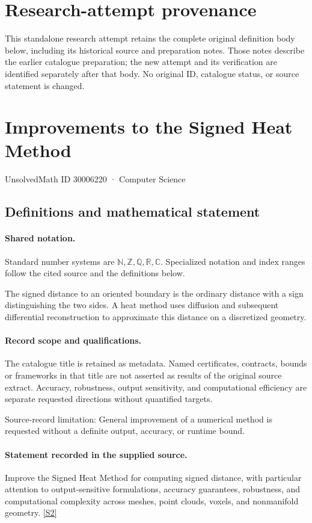 \documentclass[11pt]{article}
\begin{document}
\section*{Research-attempt provenance}
This standalone research attempt retains the complete original definition body below,
including its historical source and preparation notes. Those notes describe the
earlier catalogue preparation; the new attempt and its verification are identified
separately after that body. No original ID, catalogue status, or source statement is changed.

\section{Improvements to the Signed Heat Method}\label{30006220}
{\small UnsolvedMath ID 30006220 · Computer Science}
\subsection{Definitions and mathematical statement}

\paragraph{Shared notation.}Standard number systems are $\mathbb N,\mathbb Z,\mathbb Q,\mathbb R,\mathbb C$. Specialized notation and index ranges follow the cited source and the definitions below.


The signed distance to an oriented boundary is the ordinary distance with a sign distinguishing the two sides. A heat method uses diffusion and subsequent differential reconstruction to approximate this distance on a discretized geometry.
\paragraph{Record scope and qualifications.}
The catalogue title is retained as metadata. Named certificates, contracts, bounds or frameworks in that title are not asserted as results of the original source extract.
Accuracy, robustness, output sensitivity, and computational efficiency are separate requested directions without quantified targets.

Source-record limitation: General improvement of a numerical method is requested without a definite output, accuracy, or runtime bound.
\paragraph{Statement recorded in the supplied source.}
Improve the Signed Heat Method for computing signed distance, with particular attention to output-sensitive formulations, accuracy guarantees, robustness, and computational complexity across meshes, point clouds, voxels, and nonmanifold geometry. \href{https://doi.org/10.4171/owr/2025/5}{[S2]}
\end{document}
